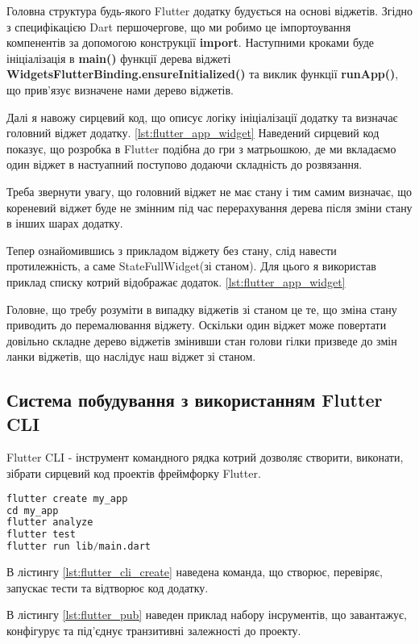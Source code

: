 Головна структура будь-якого Flutter додатку будується на основі віджетів.
Згідно з специфікацією Dart першочергове, що ми робимо це імпортоування компенентів за допомогою конструкції \textbf{import}.
Наступними кроками буде ініціалізація в \textbf{main()} функції дерева віджеті \textbf{WidgetsFlutterBinding.ensureInitialized()} та
виклик функції \textbf{runApp()}, що прив'язує визначене нами дерево віджетів.

Далі я навожу сирцевий код, що описує логіку ініціалізації додатку та визначає головний віджет додатку. \ref{lst:flutter_app_widget}
Наведений сирцевий код показує, що розробка в Flutter подібна до гри з матрьошкою,
де ми вкладаємо один віджет в настуапний поступово додаючи складність до розвязання.

Треба звернути увагу, що головний віджет не має стану і тим самим визначає, що кореневий віджет буде не змінним
під час перерахування дерева після зміни стану в інших шарах додатку.

Тепер ознайомившись з прикладом віджету без стану, слід навести протилежність, а саме StateFullWidget(зі станом).
Для цього я використав приклад списку котрий відображає додаток. \ref{lst:flutter_app_widget}

Головне, що требу розуміти в випадку віджетів зі станом це те, що зміна стану приводить до перемалювання віджету.
Оскільки один віджет може повертати довільно складне дерево віджетів змінивши стан голови гілки призведе до змін
ланки віджетів, що наслідує наш віджет зі станом.

\subsection{Система побудування з використанням Flutter CLI}
\label{subsec:flutter_cli_theory}
Flutter CLI - інструмент командного рядка котрий дозволяє створити, виконати, зібрати сирцевий код проектів фреймфорку Flutter.

\begin{lstlisting}[style=light, language=Python,label={lst:flutter_cli_create},caption=Flutter Create Project]
flutter create my_app
cd my_app
flutter analyze
flutter test
flutter run lib/main.dart
\end{lstlisting}

В лістингу \ref{lst:flutter_cli_create} наведена команда, що створює, перевіряє, запускає тести та відтворює код додатку.

В лістингу \ref{lst:flutter_pub} наведен приклад набору інсрументів,
що завантажує, конфігурує та під'єднує транзитивні залежності до проекту.

